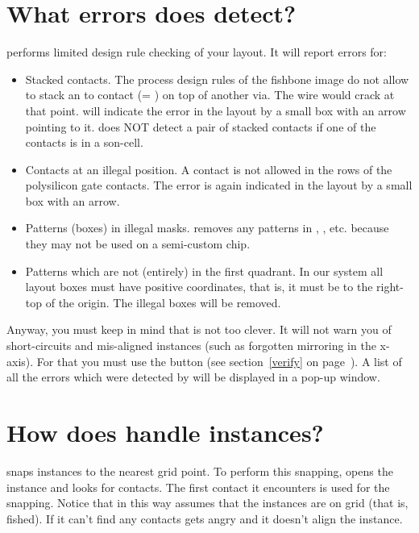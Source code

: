 \section{What errors does \protect{} detect?}
 performs limited design rule checking of your layout.
It will report errors for:
\begin{itemize}
\item
Stacked contacts. 
The process design rules of the fishbone image do not
allow to stack an  to  contact (= ) on top
of another via. The wire would crack at that point.
 will indicate the error in the layout by a small
box with an arrow pointing to it.  
does NOT detect a pair of stacked contacts if one of the contacts is in
a son-cell.
\item
{}
Contacts at an illegal position. A  contact is not allowed in
the rows of the polysilicon gate contacts.  The error is again
indicated in the layout by a small box with an arrow.
\item
Patterns (boxes) in illegal masks.  removes any patterns in
, , etc. because they may not be used on a
semi-custom chip.
\item
Patterns which are not (entirely) in the first quadrant. In our system
all layout boxes must have positive coordinates, that is, it must be to
the right-top of the origin. The illegal boxes will be removed.
\end{itemize}

Anyway, you must keep in mind that  is not too clever.  It
will not warn you of short-circuits and mis-aligned instances (such as
forgotten mirroring in the x-axis). For that you must use the button
 (see section~\ref{verify} on
page~\pageref{verify}).  A list of all the errors which were detected by
 will be displayed in a pop-up window.

\section{How does \protect{} handle instances?}
 snaps instances to the nearest grid point. To
perform this snapping,  opens the instance and looks for
contacts. The first contact it encounters is used for the snapping.
Notice that in this way  assumes that the instances are on
grid (that is, fished).  If it can't find any contacts  gets
angry and it doesn't align the instance.

